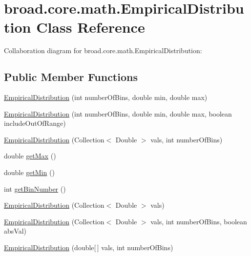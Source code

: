 \hypertarget{classbroad_1_1core_1_1math_1_1_empirical_distribution}{\section{broad.\+core.\+math.\+Empirical\+Distribution Class Reference}
\label{classbroad_1_1core_1_1math_1_1_empirical_distribution}
}


Collaboration diagram for broad.\+core.\+math.\+Empirical\+Distribution\+:
\subsection*{Public Member Functions}
\begin{DoxyCompactItemize}
\item 
\hyperlink{classbroad_1_1core_1_1math_1_1_empirical_distribution_a25dac12f5d3f044aae983f166ab92abd}{Empirical\+Distribution} (int number\+Of\+Bins, double min, double max)
\item 
\hyperlink{classbroad_1_1core_1_1math_1_1_empirical_distribution_a809c3e51e274616f58b815a73e661505}{Empirical\+Distribution} (int number\+Of\+Bins, double min, double max, boolean include\+Out\+Of\+Range)
\item 
\hyperlink{classbroad_1_1core_1_1math_1_1_empirical_distribution_a09e668b8a7485f601a3783f4476b9746}{Empirical\+Distribution} (Collection$<$ Double $>$ vals, int number\+Of\+Bins)
\item 
double \hyperlink{classbroad_1_1core_1_1math_1_1_empirical_distribution_aea21ebb0d17ee335d3defce2b97150d0}{get\+Max} ()
\item 
double \hyperlink{classbroad_1_1core_1_1math_1_1_empirical_distribution_a754b27b52a19d7593e342e06308f9ae9}{get\+Min} ()
\item 
int \hyperlink{classbroad_1_1core_1_1math_1_1_empirical_distribution_a1382490334a88b8e154afb8733868f6c}{get\+Bin\+Number} ()
\item 
\hyperlink{classbroad_1_1core_1_1math_1_1_empirical_distribution_a717b91cad70db219051cc4c2d27032f2}{Empirical\+Distribution} (Collection$<$ Double $>$ vals)
\item 
\hyperlink{classbroad_1_1core_1_1math_1_1_empirical_distribution_a7052d93e93b336bd6db74e53123af3cc}{Empirical\+Distribution} (Collection$<$ Double $>$ vals, int number\+Of\+Bins, boolean abs\+Val)
\item 
\hyperlink{classbroad_1_1core_1_1math_1_1_empirical_distribution_abd64e2d6bda6ac86bdd4b65cb34df52e}{Empirical\+Distribution} (double\mbox{[}$\,$\mbox{]} vals, int number\+Of\+Bins)

\end{DoxyCompactItemize}
